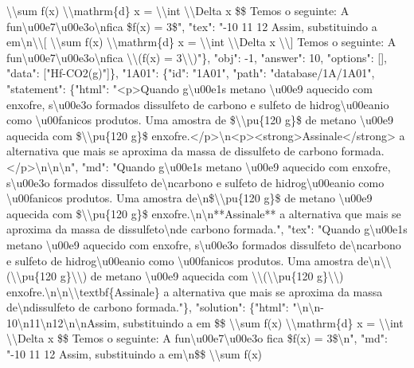 \textbackslash{}\textbackslash{}sum f(x) \textbackslash{}\textbackslash{}mathrm\{d\} x = \textbackslash{}\textbackslash{}int \textbackslash{}\textbackslash{}Delta x \$\$ Temos o seguinte: A fun\textbackslash{}u00e7\textbackslash{}u00e3o\textbackslash{}nfica \$f(x) = 3\$", "tex": "{-}10 11 12 Assim, substituindo a em\textbackslash{}n\textbackslash{}\textbackslash{}{[} \textbackslash{}\textbackslash{}sum f(x) \textbackslash{}\textbackslash{}mathrm\{d\} x = \textbackslash{}\textbackslash{}int \textbackslash{}\textbackslash{}Delta x \textbackslash{}\textbackslash{}{]} Temos o seguinte: A fun\textbackslash{}u00e7\textbackslash{}u00e3o\textbackslash{}nfica \textbackslash{}\textbackslash{}(f(x) = 3\textbackslash{}\textbackslash{})"\}, "obj": {-}1, "answer": 10, "options": {[}{]}, "data": {[}"Hf{-}CO2(g)"{]}\}, "1A01": \{"id": "1A01", "path": "database/1A/1A01", "statement": \{"html": "<p>Quando g\textbackslash{}u00e1s metano \textbackslash{}u00e9 aquecido com enxofre, s\textbackslash{}u00e3o formados dissulfeto de carbono e sulfeto de hidrog\textbackslash{}u00eanio como \textbackslash{}u00fanicos produtos. Uma amostra de \$\textbackslash{}\textbackslash{}pu\{120 g\}\$ de metano \textbackslash{}u00e9 aquecida com \$\textbackslash{}\textbackslash{}pu\{120 g\}\$ enxofre.</p>\textbackslash{}n<p><strong>Assinale</strong> a alternativa que mais se aproxima da massa de dissulfeto de carbono formada.</p>\textbackslash{}n\textbackslash{}n\textbackslash{}n", "md": "Quando g\textbackslash{}u00e1s metano \textbackslash{}u00e9 aquecido com enxofre, s\textbackslash{}u00e3o formados dissulfeto de\textbackslash{}ncarbono e sulfeto de hidrog\textbackslash{}u00eanio como \textbackslash{}u00fanicos produtos. Uma amostra de\textbackslash{}n\$\textbackslash{}\textbackslash{}pu\{120 g\}\$ de metano \textbackslash{}u00e9 aquecida com \$\textbackslash{}\textbackslash{}pu\{120 g\}\$ enxofre.\textbackslash{}n\textbackslash{}n**Assinale** a alternativa que mais se aproxima da massa de dissulfeto\textbackslash{}nde carbono formada.", "tex": "Quando g\textbackslash{}u00e1s metano \textbackslash{}u00e9 aquecido com enxofre, s\textbackslash{}u00e3o formados dissulfeto de\textbackslash{}ncarbono e sulfeto de hidrog\textbackslash{}u00eanio como \textbackslash{}u00fanicos produtos. Uma amostra de\textbackslash{}n\textbackslash{}\textbackslash{}(\textbackslash{}\textbackslash{}pu\{120 g\}\textbackslash{}\textbackslash{}) de metano \textbackslash{}u00e9 aquecida com \textbackslash{}\textbackslash{}(\textbackslash{}\textbackslash{}pu\{120 g\}\textbackslash{}\textbackslash{}) enxofre.\textbackslash{}n\textbackslash{}n\textbackslash{}\textbackslash{}textbf\{Assinale\} a alternativa que mais se aproxima da massa de\textbackslash{}ndissulfeto de carbono formada."\}, "solution": \{"html": "\textbackslash{}n\textbackslash{}n{-}10\textbackslash{}n11\textbackslash{}n12\textbackslash{}n\textbackslash{}nAssim, substituindo a em \$\$ \textbackslash{}\textbackslash{}sum f(x) \textbackslash{}\textbackslash{}mathrm\{d\} x = \textbackslash{}\textbackslash{}int \textbackslash{}\textbackslash{}Delta x \$\$ Temos o seguinte: A fun\textbackslash{}u00e7\textbackslash{}u00e3o fica \$f(x) = 3\$\textbackslash{}n", "md": "{-}10 11 12 Assim, substituindo a em\textbackslash{}n\$\$ \textbackslash{}\textbackslash{}sum f(x) 